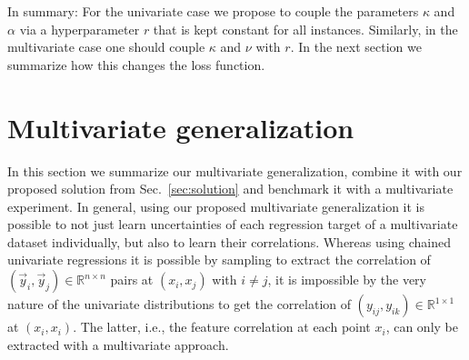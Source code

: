 \documentclass{article}
\begin{document}
In summary: For the univariate case we propose to couple the parameters $\kappa$ and $\alpha$ via a hyperparameter $r$ that is kept constant for all instances.
Similarly, in the multivariate case one should couple $\kappa$ and $\nu$ with $r$.
In the next section we summarize how this changes the loss function.

\section{Multivariate generalization}
\label{sec:multi}
In this section we summarize our multivariate generalization, combine it with our proposed solution from Sec.~\ref{sec:solution} and benchmark it with a multivariate experiment.
In general, using our proposed multivariate generalization it is possible to not just learn uncertainties of each regression target of a multivariate dataset individually, but also to learn their correlations.
Whereas using chained univariate regressions it is possible by sampling to extract the correlation of $(\vec{y}_i, \vec{y}_j) \in \mathbb{R}^{n \times n}$ pairs at $(x_i, x_j)$ with $i \neq j$, it is impossible by the very nature of the univariate distributions to get the correlation of $(y_{ij}, y_{ik}) \in \mathbb{R}^{1 \times 1}$ at $(x_i, x_i)$.
The latter, i.e., the feature correlation at each point $x_i$, can only be extracted with a multivariate approach.
\end{document}

